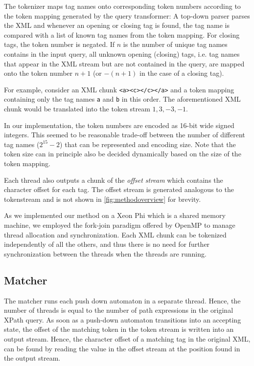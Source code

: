 The tokenizer maps tag names onto corresponding token numbers according to the
token mapping generated by the query transformer: A top-down parser parses the
XML and whenever an opening or closing tag is found, the tag name is compared
with a list of known tag names from the token mapping. For closing tags, the
token number is negated. If $n$ is the number of unique tag names contains in
the input query, all unknown opening (closing) tags, i.e. tag names that appear
in the XML stream but are not contained in the query, are mapped onto the token
number $n+1$ (or $-(n+1)$ in the case of a closing tag).

For example, consider an XML chunk \verb;<a><c></c></a>; and a token mapping
containing only the tag names \verb;a; and \verb;b; in this order. The
aforementioned XML chunk would be translated into the token stream $1, 3, -3,
-1$.

In our implementation, the token numbers are encoded as 16-bit wide signed
integers. This seemed to be reasonable trade-off between the number of different
tag names ($2^{15}-2$) that can be represented and encoding size. Note that the
token size can in principle also be decided dynamically based on the size of the
token mapping.

Each thread also outputs a chunk of the \emph{offset stream} which contains the
character offset for each tag. The offset stream is generated analogous to the
tokenstream and is not shown in \ref{fig:methodoverview} for brevity.

As we implemented our method on a Xeon Phi \cite{IntelXeon} which is a shared
memory machine, we employed the fork-join paradigm offered by OpenMP to manage
thread allocation and synchronization. Each XML chunk can be tokenized
independently of all the others, and thus there is no need for further
synchronization between the threads when the threads are running.

\subsection{Matcher}

The matcher runs each push down automaton in a separate thread. Hence, the
number of threads is equal to the number of path expressions in the original
XPath query. As soon as a push-down automaton transitions into an accepting
state, the offset of the matching token in the token stream is written into an
output stream. Hence, the character offset of a matching tag in the original
XML, can be found by reading the value in the offset stream at the position
found in the output stream.


